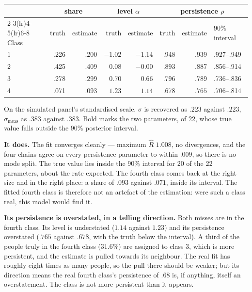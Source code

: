 \documentclass[11pt]{article}
\begin{document}
\begin{center}\small
\begin{tabular}{lrrrrrrl}
\toprule
 & \multicolumn{2}{c}{share} & \multicolumn{2}{c}{level $\alpha$} &
\multicolumn{3}{c}{persistence $\rho$} \\
\cmidrule(lr){2-3}\cmidrule(lr){4-5}\cmidrule(lr){6-8}
Class & truth & estimate & truth & estimate & truth & estimate & 90\% interval \\
\midrule
1 & .226 & .200 & $-1.02$ & $-1.14$ & .948 & .939 & .927--.949 \\
2 & .425 & .409 & $0.08$ & $-0.00$ & .893 & .887 & .856--.914 \\
3 & .278 & .299 & $0.70$ & $0.66$ & .796 & .789 & .736--.836 \\
4 & .071 & .093 & $1.23$ & $\mathbf{1.14}$ & .678 & $\mathbf{.765}$ & .706--.814 \\
\bottomrule
\end{tabular}

{\scriptsize On the simulated panel's standardised scale. $\sigma$ is
recovered as $.223$ against $.223$, $\sigma_{\text{meas}}$ as $.383$ against
$.383$. Bold marks the two parameters, of 22, whose true value falls outside
the 90\% posterior interval.}
\end{center}

\textbf{It does.} The fit converges cleanly --- maximum $\hat R$ $1.008$, no
divergences, and the four chains agree on every persistence parameter to
within $.009$, so there is no mode split. The true value lies inside the 90\%
interval for 20 of the 22 parameters, about the rate expected. The fourth
class comes back at the right size and in the right place: a share of $.093$
against $.071$, inside its interval. The fitted fourth class is therefore not
an artefact of the estimation: were such a class real, this model would find
it.

\textbf{Its persistence is overstated, in a telling direction.} Both misses
are in the fourth class. Its level is understated ($1.14$ against $1.23$) and
its persistence overstated ($.765$ against $.678$, with the truth below the
interval). A third of the people truly in the fourth class ($31.6\%$) are
assigned to class 3, which is more persistent, and the estimate is pulled
towards its neighbour. The real fit has roughly eight times as many people,
so the pull there should be weaker; but its direction means the real fourth
class's persistence of $.68$ is, if anything, itself an overstatement. The
class is not more persistent than it appears.
\end{document}
